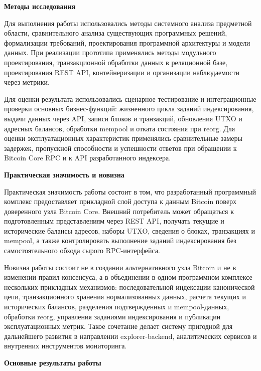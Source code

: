 \textbf{Методы исследования}

Для выполнения работы использовались методы системного анализа предметной
области, сравнительного анализа существующих программных решений,
формализации требований, проектирования программной архитектуры и модели
данных. При реализации прототипа применялись методы модульного проектирования,
транзакционной обработки данных в реляционной базе, проектирования REST API,
контейнеризации и организации наблюдаемости через метрики.

Для оценки результата использовались сценарное тестирование и интеграционные
проверки основных бизнес-функций: жизненного цикла заданий индексирования,
выдачи данных через API, записи блоков и транзакций, обновления UTXO и
адресных балансов, обработки mempool и отката состояния при reorg. Для оценки
эксплуатационных характеристик применялись сравнительные замеры задержек,
пропускной способности и успешности ответов при обращении к Bitcoin Core RPC и
к API разработанного индексера.

\textbf{Практическая значимость и новизна}

Практическая значимость работы состоит в том, что разработанный программный
комплекс предоставляет прикладной слой доступа к данным Bitcoin поверх
доверенного узла Bitcoin Core. Внешний потребитель может обращаться к
подготовленным представлениям через REST API, получать текущие и исторические
балансы адресов, наборы UTXO, сведения о блоках, транзакциях и mempool, а также
контролировать выполнение заданий индексирования без самостоятельного обхода
сырого RPC-интерфейса.

Новизна работы состоит не в создании альтернативного узла Bitcoin и не в
изменении правил консенсуса, а в объединении в одном программном комплексе
нескольких прикладных механизмов: последовательной индексации канонической
цепи, транзакционного хранения нормализованных данных, расчета текущих и
исторических балансов, разделения подтвержденных и mempool-данных, обработки
reorg, управления заданиями индексирования и публикации эксплуатационных
метрик. Такое сочетание делает систему пригодной для дальнейшего развития в
направлении explorer-backend, аналитических сервисов и внутренних
инструментов мониторинга.

\textbf{Основные результаты работы}

